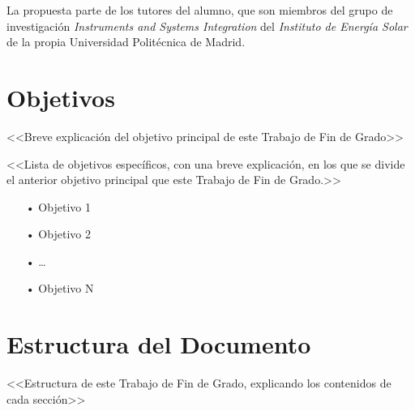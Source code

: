 La propuesta parte de los tutores del alumno, que son miembros del grupo de investigación \textit{Instruments and Systems Integration} del \textit{Instituto de Energía Solar} de la propia Universidad Politécnica de Madrid.


\section{Objetivos} \label{sct:intro:objetivos}

<<Breve explicación del objetivo principal de este Trabajo de Fin de Grado>>

<<Lista de objetivos específicos, con una breve explicación, en los que se divide el anterior objetivo principal que este Trabajo de Fin de Grado.>>

\begin{itemize}

    \item[•] Objetivo 1

    \item[•] Objetivo 2

    \item[•] \ldots

    \item[•] Objetivo N

\end{itemize}


\section{Estructura del Documento} \label{sct:intro_estructura}

<<Estructura de este Trabajo de Fin de Grado, explicando los contenidos de cada sección>>

